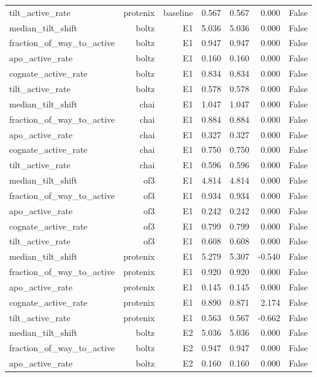 \begin{table}[htbp]
\begin{tabular}{lrrrrrr}
tilt\_active\_rate & protenix & baseline & 0.567 & 0.567 & 0.000 & False \\
median\_tilt\_shift & boltz & E1 & 5.036 & 5.036 & 0.000 & False \\
fraction\_of\_way\_to\_active & boltz & E1 & 0.947 & 0.947 & 0.000 & False \\
apo\_active\_rate & boltz & E1 & 0.160 & 0.160 & 0.000 & False \\
cognate\_active\_rate & boltz & E1 & 0.834 & 0.834 & 0.000 & False \\
tilt\_active\_rate & boltz & E1 & 0.578 & 0.578 & 0.000 & False \\
median\_tilt\_shift & chai & E1 & 1.047 & 1.047 & 0.000 & False \\
fraction\_of\_way\_to\_active & chai & E1 & 0.884 & 0.884 & 0.000 & False \\
apo\_active\_rate & chai & E1 & 0.327 & 0.327 & 0.000 & False \\
cognate\_active\_rate & chai & E1 & 0.750 & 0.750 & 0.000 & False \\
tilt\_active\_rate & chai & E1 & 0.596 & 0.596 & 0.000 & False \\
median\_tilt\_shift & of3 & E1 & 4.814 & 4.814 & 0.000 & False \\
fraction\_of\_way\_to\_active & of3 & E1 & 0.934 & 0.934 & 0.000 & False \\
apo\_active\_rate & of3 & E1 & 0.242 & 0.242 & 0.000 & False \\
cognate\_active\_rate & of3 & E1 & 0.799 & 0.799 & 0.000 & False \\
tilt\_active\_rate & of3 & E1 & 0.608 & 0.608 & 0.000 & False \\
median\_tilt\_shift & protenix & E1 & 5.279 & 5.307 & -0.540 & False \\
fraction\_of\_way\_to\_active & protenix & E1 & 0.920 & 0.920 & 0.000 & False \\
apo\_active\_rate & protenix & E1 & 0.145 & 0.145 & 0.000 & False \\
cognate\_active\_rate & protenix & E1 & 0.890 & 0.871 & 2.174 & False \\
tilt\_active\_rate & protenix & E1 & 0.563 & 0.567 & -0.662 & False \\
median\_tilt\_shift & boltz & E2 & 5.036 & 5.036 & 0.000 & False \\
fraction\_of\_way\_to\_active & boltz & E2 & 0.947 & 0.947 & 0.000 & False \\
apo\_active\_rate & boltz & E2 & 0.160 & 0.160 & 0.000 & False \\

\end{tabular}
\end{table}
